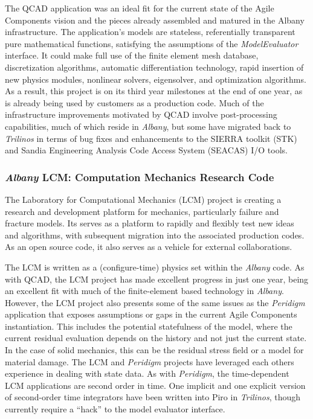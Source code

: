 \documentclass[pdf,ps2pdf,12pt,report]{SANDreport}
\theoremstyle{plain}
\theoremstyle{definition}
\theoremstyle{remark}
\numberwithin{equation}{section}
\begin{document}
The QCAD application was an ideal fit for the current state of the Agile Components vision and the pieces already assembled and matured in the Albany infrastructure. The application's models are stateless, referentially transparent pure mathematical functions, satisfying the assumptions of the \emph{ModelEvaluator} interface. It could make full use of the finite element mesh database, discretization algorithms, automatic differentiation technology, rapid insertion of new physics modules, nonlinear solvers, eigensolver, and optimization algorithms. As a result, this project is on its third year milestones at the end of one year, as is already being used by customers as a production code. Much of the infrastructure improvements motivated by QCAD involve post-processing capabilities, much of which reside in \emph{Albany}, but some have migrated back to \emph{Trilinos} in terms of bug fixes and enhancements to the SIERRA toolkit (STK) and Sandia Engineering Analysis Code Access System (SEACAS) I/O tools.

\subsubsection{\emph{Albany} LCM: Computation Mechanics Research Code} \label{sec:albany:lcm}

The Laboratory for Computational Mechanics (LCM) project \cite{LCMWebPage:2011} is creating a research and development platform for mechanics, particularly failure and fracture models. Its serves as a platform to rapidly and flexibly test new ideas and algorithms, with subsequent migration into the associated production codes. As an open source code, it also serves as a vehicle for external collaborations.

The LCM is written as a (configure-time) physics set within the \emph{Albany} code. As with QCAD, the LCM project has made excellent progress in just one year, being an excellent fit with much of the finite-element based technology in \emph{Albany}. However, the LCM project also presents some of the same issues as the \emph{Peridigm} application that exposes assumptions or gaps in the current Agile Components instantiation. This includes the potential statefulness of the model, where the current residual evaluation depends on the history and not just the current state. In the case of solid mechanics, this can be the residual stress field or a model for material damage. The LCM and \emph{Peridigm} projects have leveraged each others experience in dealing with state data. As with \emph{Peridigm}, the time-dependent LCM applications are second order in time. One implicit and one explicit version of second-order time integrators have been written into Piro in \emph{Trilinos}, though currently require a ``hack'' to the model evaluator interface.
\end{document}
